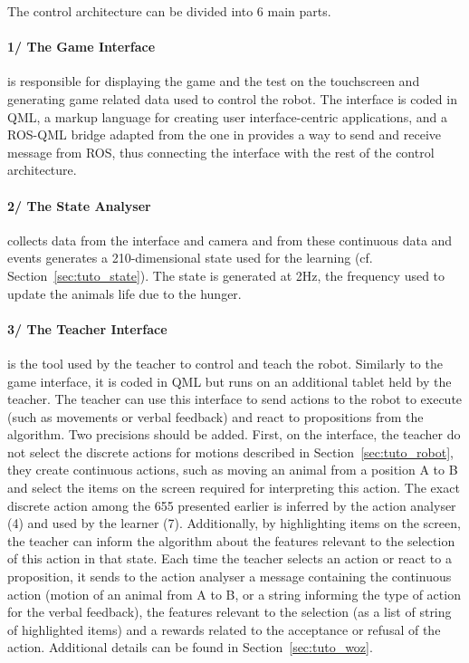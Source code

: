 
The control architecture can be divided into 6 main parts.

\paragraph{1/ The Game Interface} is responsible for displaying the game and the test on the touchscreen and generating game related data used to control the robot. The interface is coded in QML, a markup language for creating user interface-centric applications, and a ROS-QML bridge adapted from the one in \cite{lemaignan2017free} provides a way to send and receive message from ROS, thus connecting the interface with the rest of the control architecture.

\paragraph{2/ The State Analyser} collects data from the interface and camera and from these continuous data and events generates a 210-dimensional state used for the learning (cf. Section~\ref{sec:tuto_state}). The state is generated at 2Hz, the frequency used to update the animals life due to the hunger.

\paragraph{3/ The Teacher Interface} is the tool used by the teacher to control and teach the robot. Similarly to the game interface, it is coded in QML but runs on an additional tablet held by the teacher. The teacher can use this interface to send actions to the robot to execute (such as movements or verbal feedback) and react to propositions from the algorithm. Two precisions should be added. First, on the interface, the teacher do not select the discrete actions for motions described in Section~\ref{sec:tuto_robot}, they create continuous actions, such as moving an animal from a position A to B and select the items on the screen required for interpreting this action. The exact discrete action among the 655 presented earlier is inferred by the action analyser (4) and used by the learner (7). Additionally, by highlighting items on the screen, the teacher can inform the algorithm about the features relevant to the selection of this action in that state. Each time the teacher selects an action or react to a proposition, it sends to the action analyser a message containing the continuous action (motion of an animal from A to B, or a string informing the type of action for the verbal feedback), the features relevant to the selection (as a list of string of highlighted items) and a rewards related to the acceptance or refusal of the action. Additional details can be found in Section~\ref{sec:tuto_woz}. 


